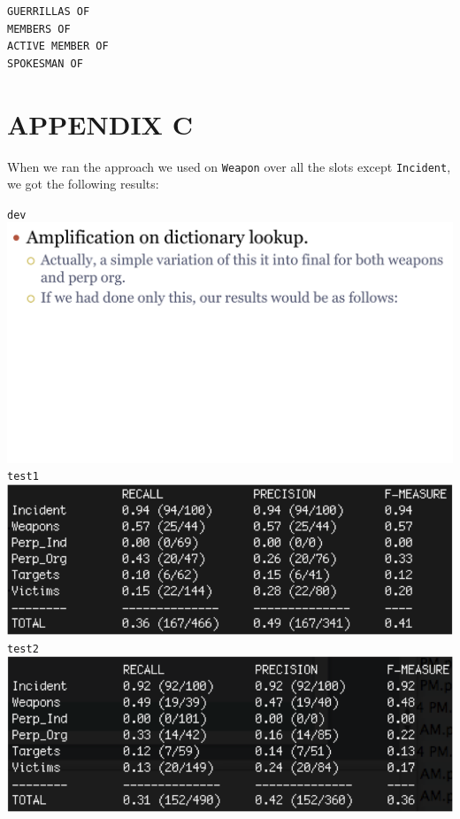 \documentclass[11pt]{myclass}
\begin{document}
\begin{verbatim}
GUERRILLAS OF
MEMBERS OF
ACTIVE MEMBER OF
SPOKESMAN OF 	
\end{verbatim}

\section{APPENDIX C}

When we ran the approach we used on \texttt{Weapon} over all the slots except \texttt{Incident}, we got the following results:

\texttt{dev}
\includegraphics[scale=0.75]{amp_dev.png} \\

\texttt{test1}
\includegraphics[scale=0.75]{amp_t1.png} \\

\texttt{test2}
\includegraphics[scale=0.75]{amp_t2.png} \\
\end{document}
